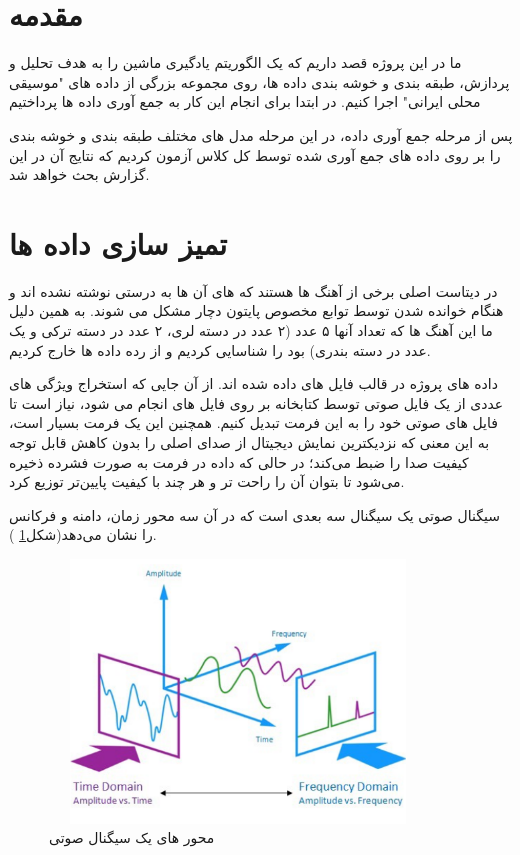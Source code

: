 \documentclass[12pt,onecolumn,a4paper]{article}
\begin{document}

\section{مقدمه} 

ما در این پروژه قصد داریم که یک الگوریتم یادگیری ماشین را به هدف تحلیل و پردازش، طبقه بندی و خوشه بندی داده ها، روی مجموعه بزرگی از داده های "موسیقی محلی ایرانی" اجرا کنیم.
در ابتدا برای انجام این کار به جمع آوری داده ها پرداختیم

پس از مرحله جمع آوری داده، در این مرحله مدل های مختلف طبقه بندی و خوشه بندی را بر روی داده های جمع آوری شده توسط کل کلاس آزمون کردیم که نتایج آن در این گزارش بحث خواهد شد.

\section{تمیز سازی داده ها}
در دیتاست اصلی برخی از آهنگ ها هستند که  های آن ها به درستی نوشته نشده اند و هنگام خوانده شدن توسط توابع مخصوص پایتون دچار مشکل می شوند. به همین دلیل ما این آهنگ ها که تعداد آنها ۵ عدد (۲ عدد در دسته لری، ۲ عدد در دسته ترکی و یک عدد در دسته بندری) بود را شناسایی کردیم و از رده داده ها خارج کردیم.

داده های پروژه در قالب فایل های  داده شده اند. از آن جایی که استخراج ویژگی های عددی از یک فایل صوتی توسط کتابخانه  بر روی فایل های  انجام می شود، نیاز است تا فایل های صوتی خود را به این فرمت تبدیل کنیم. همچنین این یک فرمت بسیار  است، به این معنی که نزدیکترین نمایش دیجیتال از صدای اصلی را بدون کاهش قابل توجه کیفیت صدا را ضبط می‌کند؛ در حالی که داده در فرمت  به صورت فشرده ذخیره می‌شود تا بتوان آن را راحت تر و هر چند با کیفیت پایین‌تر توزیع کرد.

سیگنال صوتی یک سیگنال سه بعدی است که در آن سه محور زمان، دامنه و فرکانس را نشان می‌دهد(شکل\ref{fig:Acoustic signal} ).

\begin{figure}
  \centering
  \includegraphics[width=10cm,height=7cm,keepaspectratio]{1.png}
  \caption{محور های یک سیگنال صوتی}
  \label{fig:Acoustic signal}
\end{figure}
\end{document}
